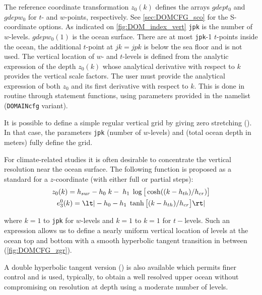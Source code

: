 \documentclass[../main/NEMO_manual]{subfiles}
\begin{document}
The reference coordinate transformation $z_0(k)$ defines the arrays $gdept_0$ and
$gdepw_0$ for $t$- and $w$-points, respectively. See \autoref{sec:DOMCFG_sco} for the
S-coordinate options.  As indicated on \autoref{fig:DOM_index_vert} \texttt{jpk} is the number of
$w$-levels.  $gdepw_0(1)$ is the ocean surface.  There are at most \texttt{jpk}-1 $t$-points
inside the ocean, the additional $t$-point at $jk = jpk$ is below the sea floor and is not
used.  The vertical location of $w$- and $t$-levels is defined from the analytic
expression of the depth $z_0(k)$ whose analytical derivative with respect to $k$ provides
the vertical scale factors.  The user must provide the analytical expression of both $z_0$
and its first derivative with respect to $k$.  This is done in routine 
through statement functions, using parameters provided in the  namelist
(\texttt{DOMAINcfg} variant).

It is possible to define a simple regular vertical grid by giving zero stretching
().  In that case, the parameters \texttt{jpk} (number of $w$-levels)
and  (total ocean depth in meters) fully define the grid.

For climate-related studies it is often desirable to concentrate the vertical resolution
near the ocean surface.  The following function is proposed as a standard for a
$z$-coordinate (with either full or partial steps):
\begin{gather}
  \label{eq:DOMCFG_zgr_ana_1}
    z_0  (k) = h_{sur} - h_0 \; k - \; h_1 \; \log  \big[ \cosh ((k - h_{th}) / h_{cr}) \big] \\
    e_3^0(k) = \lt|    - h_0      -    h_1 \; \tanh \big[        (k - h_{th}) / h_{cr}  \big] \rt|
\end{gather}

where $k = 1$ to \texttt{jpk} for $w$-levels and $k = 1$ to $k = 1$ for $t-$levels.  Such an
expression allows us to define a nearly uniform vertical location of levels at the ocean
top and bottom with a smooth hyperbolic tangent transition in between (\autoref{fig:DOMCFG_zgr}).

A double hyperbolic tangent version () is also available
which permits finer control and is used, typically, to obtain a well resolved upper ocean
without compromising on resolution at depth using a moderate number of levels.
\end{document}
